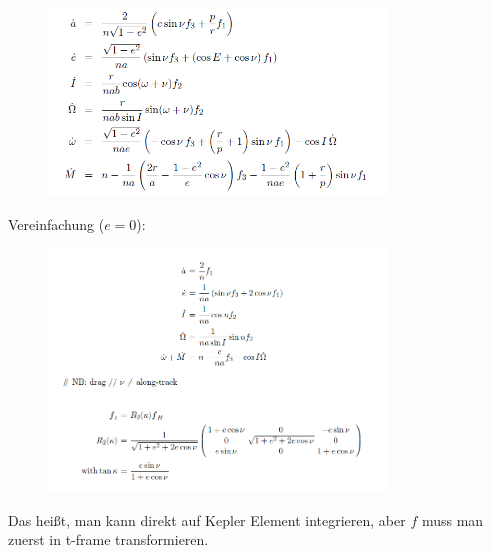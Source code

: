 \documentclass{article}
\begin{document}
\section{}
\begin{figure}[H]
	\centering
	\includegraphics[width=0.8\textwidth]{LPE.png} 
	\caption{} \label{fig:1}
\end{figure}
Vereinfachung ($e=0$):
\begin{figure}[H]
	\centering
	\includegraphics[width=0.8\textwidth]{LPE2.png} 
	\caption{} \label{fig:2}
\end{figure}
Das heißt, man kann direkt auf Kepler Element integrieren, aber $f$ muss man zuerst in t-frame transformieren. 
\end{document}
